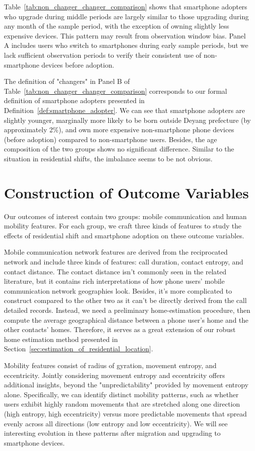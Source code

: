 \clearpage\newpage
Table~\ref{tab:non_changer_changer_comparison} shows that smartphone adopters who upgrade during middle periods are largely similar to those upgrading during any month of the sample period, with the exception of owning slightly less expensive devices.
This pattern may result from observation window bias.
Panel A includes users who switch to smartphones during early sample periods, but we lack sufficient observation periods to verify their consistent use of non-smartphone devices before adoption.

The definition of "changers" in Panel B of Table~\ref{tab:non_changer_changer_comparison} corresponds to our  formal definition of smartphone adopters presented in Definition~\ref{def:smartphone_adopter}.
We can see that smartphone adopters are slightly younger, marginally more likely to be born outside Deyang prefecture (by approximately 2\%), and own more expensive non-smartphone phone devices (before adoption) compared to non-smartphone users.
Besides, the age composition of the two groups shows no significant difference.
Similar to the situation in residential shifts, the imbalance seems to be not obvious.


\clearpage\newpage
\section{Construction of Outcome Variables}
Our outcomes of interest contain two groups: mobile communication and human mobility features.
For each group, we craft three kinds of features to study the effects of residential shift and smartphone adoption on these outcome variables.

Mobile communication network features are derived from the reciprocated network and include three kinds of features: call duration, contact entropy, and contact distance.
The contact distance isn't commonly seen in the related literature, but it contains rich interpretations of how phone users' mobile communication network geographies look. Besides, it's more complicated to construct compared to the other two as it can't be directly derived from the call detailed records.
Instead, we need a preliminary home-estimation procedure, then compute the average geographical distance between a phone user's home and the other contacts' homes.
Therefore, it serves as a great extension of our robust home estimation method presented in Section~\ref{sec:estimation_of_residential_location}.

Mobility features consist of radius of gyration, movement entropy, and eccentricity. Jointly considering movement entropy and eccentricity offers additional insights, beyond the "unpredictability" provided by movement entropy alone. Specifically, we can identify distinct mobility patterns, such as whether users exhibit highly random movements that are stretched along one direction (high entropy, high eccentricity) versus more predictable movements that spread evenly across all directions (low entropy and low eccentricity). We will see interesting evolution in these patterns after migration and upgrading to smartphone devices.

